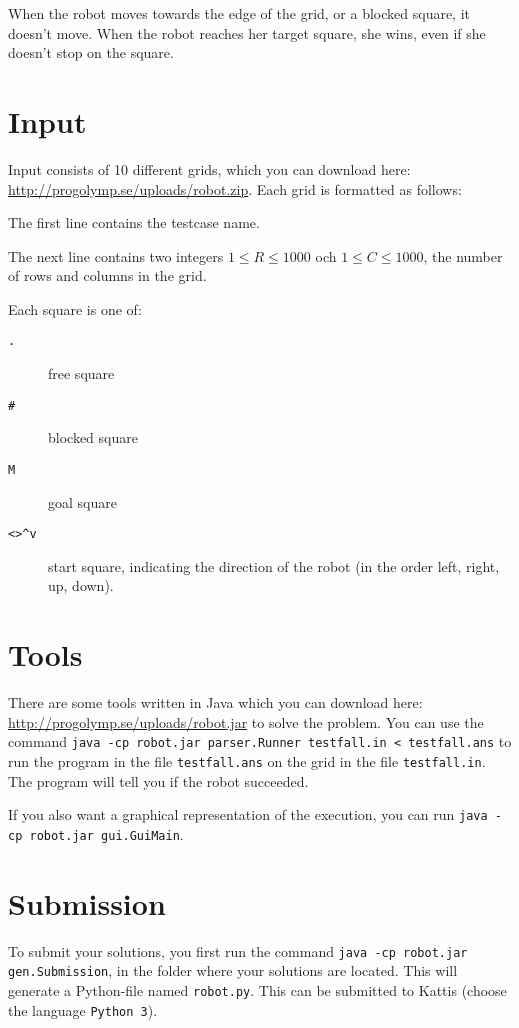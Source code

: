 When the robot moves towards the edge of the grid, or a blocked square, it doesn't move. When the robot reaches her target square, she wins, even if she doesn't stop on the square.

\section*{Input}
Input consists of 10 different grids, which you can download here: \url{http://progolymp.se/uploads/robot.zip}. Each grid is formatted as follows:

The first line contains the testcase name.

The next line contains two integers $1 \le R \le 1000$ och $1 \le C \le 1000$, the number of rows and columns in the grid.

Each square is one of:
\begin{description}
  \item[\texttt{.}] free square
  \item[\texttt{\#}] blocked square
  \item[\texttt{M}] goal square
  \item[\texttt{<>\^{}v}] start square, indicating the direction of the robot (in the order left, right, up, down).
\end{description}

\section*{Tools}
There are some tools written in Java which you can download here: \url{http://progolymp.se/uploads/robot.jar} to solve the problem. You can use the command \texttt{java -cp robot.jar parser.Runner testfall.in < testfall.ans} 
to run the program in the file \texttt{testfall.ans} on the grid in the file \texttt{testfall.in}. The program will tell you if the robot succeeded.

If you also want a graphical representation of the execution, you can run \texttt{java -cp robot.jar gui.GuiMain}.

\section*{Submission}
To submit your solutions, you first run the command \texttt{java -cp robot.jar gen.Submission}, in the folder where your solutions are located. This will generate a Python-file named \texttt{robot.py}.
This can be submitted to Kattis (choose the language \texttt{Python 3}).

